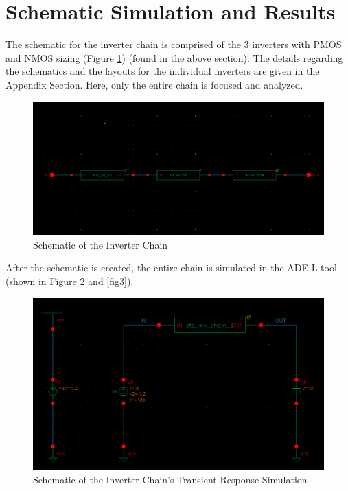 \documentclass[letterpaper, 11pt]{article}
\begin{document}
\section{Schematic Simulation and Results}
\label{sec:schematic_design}

The schematic for the inverter chain is comprised of the 3 inverters with PMOS and NMOS sizing (Figure \ref{fig1}) (found in the above section). The details regarding the schematics and the layouts for the individual inverters are given in the Appendix Section. Here, only the entire chain is focused and analyzed.

\begin{figure}[htb!]
	\centering
	\includegraphics[width=1.0\linewidth]{inv_chain_3_schematic.png}
	\caption{Schematic of the Inverter Chain}
	\label{fig1}
\end{figure}

After the schematic is created, the entire chain is simulated in the ADE L tool (shown in Figure \ref{fig2} and \ref{fig3}).

\begin{figure}[htb!]
	\centering
	\includegraphics[width=1.0\linewidth]{inv_chain_3_schematic_sim.png}
	\caption{Schematic of the Inverter Chain's Transient Response Simulation}
	\label{fig2}
\end{figure}
\end{document}
